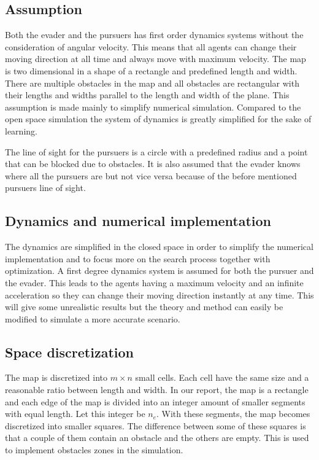 \documentclass[ebook,11pt] {kth-mag}
\begin{document}
\subsection{Assumption}
Both the evader and the pursuers has first order dynamics systems without the consideration of angular velocity. This means that all agents can change their moving direction at all time and always move with maximum velocity. The map is two dimensional in a shape of a rectangle and predefined length and width. There are multiple obstacles in the map and all obstacles are rectangular with their lengths and widths parallel to the length and width of the plane. This assumption is made mainly to simplify numerical simulation. Compared to the open space simulation the system of dynamics is greatly simplified for the sake of learning. 

The line of sight for the pursuers is a circle with a predefined radius and a point that can be blocked due to obstacles. It is also assumed that the evader knows where all the pursuers are but not vice versa because of the before mentioned pursuers line of sight. 


\subsection{Dynamics and numerical implementation}
The dynamics are simplified in the closed space in order to simplify the numerical implementation and to focus more on the search process together with optimization. A first degree dynamics system is assumed for both the pursuer and the evader. This leads to the agents having a maximum velocity and an infinite acceleration so they can change their moving direction instantly at any time. This will give some unrealistic results but the theory and method can easily be modified to simulate a more accurate scenario. 


\subsection{Space discretization}
The map is discretized into $m\times n$ small cells. Each cell have the same size and a reasonable ratio between length and width. In our report, the map is a rectangle and each edge of the map is divided into an integer amount of smaller segments with equal length. Let this integer be $n_e$. With these segments, the map becomes discretized into smaller squares. The difference between some of these squares is that a couple of them contain an obstacle and the others are empty. This is used to implement obstacles zones in the simulation. 
\end{document}
